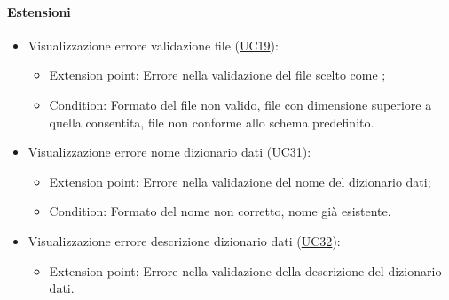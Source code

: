 \paragraph*{Estensioni}
\begin{itemize}
  \item Visualizzazione errore validazione file (\hyperref[UC19]{UC19}):
  \begin{itemize}
    \item Extension point: Errore nella validazione del file scelto come ;
    \item Condition: Formato del file non valido, file con dimensione superiore a quella consentita, file non conforme allo schema predefinito.
  \end{itemize}
  \item Visualizzazione errore nome dizionario dati (\hyperref[UC31]{UC31}):
  \begin{itemize}
    \item Extension point: Errore nella validazione del nome del dizionario dati;
    \item Condition: Formato del nome non corretto, nome già esistente.
  \end{itemize}
  \item Visualizzazione errore descrizione dizionario dati (\hyperref[UC32]{UC32}):
  \begin{itemize}
    \item Extension point: Errore nella validazione della descrizione del dizionario dati.
  \end{itemize}
\end{itemize}
